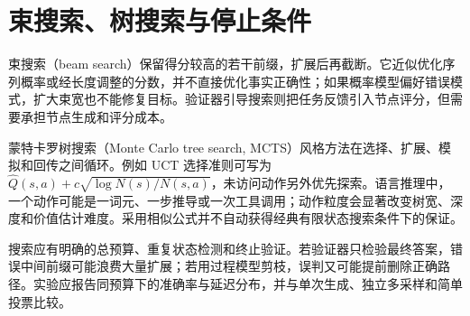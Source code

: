 \section{束搜索、树搜索与停止条件}

束搜索（beam search）保留得分较高的若干前缀，扩展后再截断。它近似优化序列概率或经长度调整的分数，并不直接优化事实正确性；如果概率模型偏好错误模式，扩大束宽也不能修复目标。验证器引导搜索则把任务反馈引入节点评分，但需要承担节点生成和评分成本。

蒙特卡罗树搜索（Monte Carlo tree search, MCTS）风格方法在选择、扩展、模拟和回传之间循环。例如 UCT 选择准则可写为 $\widehat Q(s,a)+c\sqrt{\log N(s)/N(s,a)}$，未访问动作另外优先探索。语言推理中，一个动作可能是一词元、一步推导或一次工具调用；动作粒度会显著改变树宽、深度和价值估计难度。采用相似公式并不自动获得经典有限状态搜索条件下的保证。

搜索应有明确的总预算、重复状态检测和终止验证。若验证器只检验最终答案，错误中间前缀可能浪费大量扩展；若用过程模型剪枝，误判又可能提前删除正确路径。实验应报告同预算下的准确率与延迟分布，并与单次生成、独立多采样和简单投票比较。

